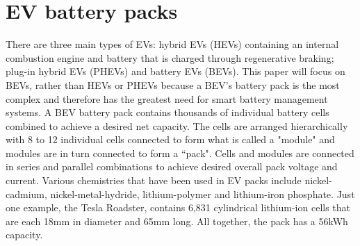	\section{EV battery packs}
		 There are three main types of EVs: hybrid EVs (HEVs) containing an internal combustion engine and battery that is charged through regenerative braking; plug-in hybrid EVs (PHEVs) and battery EVs (BEVs). This paper will focus on BEVs, rather than HEVs or PHEVs because a BEV's battery pack is the most complex and therefore has the greatest need for smart battery management systems. %
A BEV battery pack contains thousands of individual battery cells combined to achieve a desired net capacity. The cells are arranged hierarchically with 8 to 12 individual cells connected to form what is called a "module" and modules are in turn connected to form a ``pack".  Cells and modules are connected in series and parallel combinations to achieve desired overall pack voltage and current.%
Various chemistries that have been used in EV packs include nickel-cadmium, nickel-metal-hydride, lithium-polymer and lithium-iron phosphate. Just one example, the Tesla Roadster, contains 6,831 cylindrical lithium-ion cells that are each 18mm in diameter and 65mm long\cite{TeslaCellSize}. All together, the pack has a 56kWh capacity.


